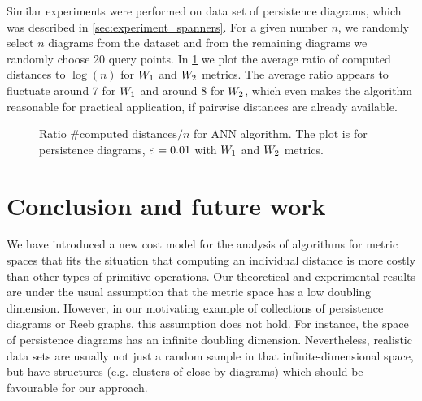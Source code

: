 Similar experiments were performed on  data set of persistence
diagrams, which was described in \cref{sec:experiment_spanners}.
For a given number $n$, we randomly select $n$ diagrams from the dataset
and from the remaining diagrams we randomly choose 20 query points.
In \cref{fig:ann_const_ratio_mcgill} we plot the average ratio of computed
distances to $\log(n)$ for ${W_{1}}$ and ${W_{2}}$ metrics.
The average ratio appears to fluctuate around 7 for ${W_{1}}$ and around 8 for ${W_{2}}$,
which even makes the algorithm
reasonable for practical application, if pairwise distances are already available.

\begin{figure}[!htbp]
    \begin{centering}
\end{centering}
    \caption{ Ratio $\mbox{\# computed distances} / n$ for ANN algorithm. The plot is for  persistence diagrams,
    $\varepsilon = 0.01$ with ${W_{1}}$ and ${W_{2}}$ metrics.}
    \label{fig:ann_const_ratio_mcgill}
\end{figure}


\section{Conclusion and future work}
\label{sec:conclusion}
%
We have introduced a new cost model for the analysis of algorithms
for metric spaces that fits the situation that computing an individual distance
is more costly than other types of primitive operations.
Our theoretical and experimental results are under the usual assumption
that the metric space has a low doubling dimension.
However, in our motivating example of collections of persistence diagrams
or Reeb graphs, this assumption does not hold. For instance,
the space of persistence diagrams has an infinite doubling dimension.
Nevertheless, realistic data sets are usually not just a random sample
in that infinite-dimensional space, but have structures
(e.g. clusters of close-by diagrams) which should be favourable for our approach.


